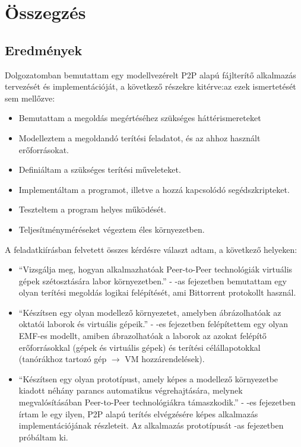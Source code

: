 \chapter{Összegzés}
\label{chp:summary}

\section{Eredmények}
 
Dolgozatomban bemutattam egy modellvezérelt P2P alapú fájlterítő alkalmazás tervezését és implementációját, a következő részekre kitérve:az ezek  ismertetését sem mellőzve:

\begin{itemize}
  \item Bemutattam a megoldás megértéséhez szükséges háttérismereteket
  \item Modelleztem a megoldandó terítési feladatot, és az ahhoz használt erőforrásokat.
  \item Definiáltam a szükséges terítési műveleteket.
  \item Implementáltam a programot, illetve a hozzá kapcsolódó segédszkripteket.
  \item Teszteltem a program helyes működését.
  \item Teljesítményméréseket végeztem éles környezetben.
\end{itemize}

A feladatkiírásban felvetett összes kérdésre választ adtam, a következő helyeken:

\begin{itemize}
  \item ``Vizsgálja  meg,  hogyan  alkalmazhatóak  Peer-to-Peer  technológiák  virtuális  gépek 
szétosztására labor környezetben.'' - -as fejezetben bemutattam egy olyan terítési megoldás logikai felépítését, ami Bittorrent protokollt használ.
  \item ``Készítsen  egy  olyan  modellező  környezetet,  amelyben  ábrázolhatóak  az  oktatói 
laborok és virtuális gépeik.'' - -es fejezetben felépítettem egy olyan EMF-es modellt, amiben ábrazolhatóak a laborok az azokat felépítő erőforrásokkal (gépek és virtuális gépek) és terítési célállapotokkal (tanórákhoz tartozó gép $\rightarrow$ VM hozzárendelések).
  \item ``Készítsen egy olyan prototípust, amely képes a modellező környezetbe kiadott  néhány
parancs  automatikus  végrehajtására,  melynek  megvalósításában  Peer-to-Peer 
technológiákra támaszkodik.'' - -es fejezetben írtam le egy ilyen, P2P alapú terítés elvégzésére képes alkalmazás implementációjának részleteit. Az alkalmazás prototípusát -as fejezetben próbáltam ki.
\end{itemize}


